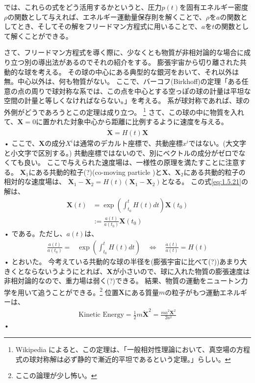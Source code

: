\documentclass[11pt,a4paper,dvipdfmx]{jsarticle}
\theoremstyle{plain}
\theoremstyle{break}
\begin{document}
では、これらの式をどう活用するかというと、圧力$p(t)$を固有エネルギー密度$\rho$の関数として与えれば、エネルギー運動量保存則を解くことで、$\rho$を$a$の関数としてとき、そしてその解をフリードマン方程式に用いることで、$a$を$t$の関数として解くことができる。

さて、フリードマン方程式を導く際に、少なくとも物質が非相対論的な場合に成り立つ別の導出法があるのでそれの紹介をする。
膨張宇宙から切り離された共動的な球を考える。
その球の中心にある典型的な銀河をおいて、それ以外は無。中心以外は、何も物質がない。
ここで、バーコフ(Birkhoff)の定理「ある任意の点の周りで球対称な系では、この点を中心とする空っぽの球の計量は平坦な空間の計量と等しくなければならない。」を考える。
系が球対称であれば、球の外側がどうであろうとこの定理は成り立つ。
\footnote{
Wikipedia によると、この定理は、「一般相対性理論において、真空場の方程式の球対称解は必ず静的で漸近的平坦であるという定理。」らしい。
}%
さて、この球の中に物質を入れて、$\mathbf{X} = 0$に置かれた対象中心から距離に比例するように速度を与える。
\begin{align}
  \dot{\mathbf{X}} = H(t) \mathbf{X} \label{eq:1.5.21}
\end{align}•%
ここで、$\mathbf{X}$の成分$X^i$は通常のデカルト座標で、共動座標$x^i$ではない。(大文字と小文字で区別する。)
共動座標ではないので、別にベクトルの成分がゼロでなくても良い。
ここで与えられた速度場は、一様性の原理を満たすことに注意する。
$\mathbf{X}_1$にある共動的粒子(?)(co-moving particle )と$\mathbf{X}$、$\mathbf{X}_2$にある共動的粒子の相対的な速度場は、
$\dot{\mathbf{X}}_{1}-\dot{\mathbf{X}}_{2}=H(t)\left(\mathbf{X}_{1}-\mathbf{X}_{2}\right)$となる。
この式\eqref{eq:1.5.21}の解は、
\begin{align}
  \mathbf{X}(t)
  	&= \exp(\int_{t_0}^{t} H(t) dt ) \mathbf{X}(t_0)\\
	& := \frac{a(t)}{a(t_0)}  \mathbf{X}(t_0)
\end{align}•%
である。ただし、$a(t)$は、
\begin{align}
  \frac{a(t)}{a(t_0)} =& \exp(\int_{t_0}^{t} H(t) dt)  \quad \Longleftrightarrow \quad \frac{\dot{a}(t)}{a(t)} = H(t)
\end{align}•%
とおいた。
今考えている共動的な球の半径を(膨張宇宙に比べて(?))あまり大きくとならないうようにとれば、$\mathbf{X}$が小さいので、球に入れた物質の膨張速度は非相対論的なので、重力場は弱く(?)できる。
結果、物質の運動をニュートン力学を用いて追うことができる。\footnote{ここの論理が少し怖い。}
位置$\mathbf{X}$にある質量$m$の粒子がもつ運動エネルギーは、
\begin{align}
\mathrm{Kinetic\,\,Energy} = \frac{1}{2} m \dot{\mathbf{X}}^{2}=\frac{m \dot{a}^{2} \mathbf{X}^{2}}{2 a^{2}}
\end{align}•%
\end{document}
